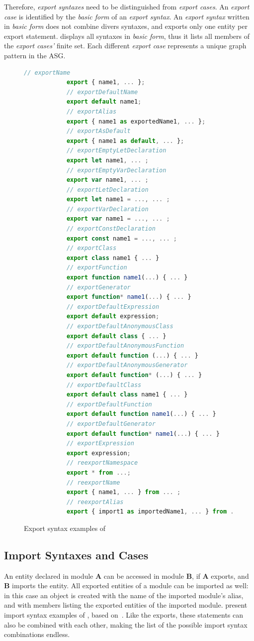 Therefore, \emph{export syntaxes} need to be distinguished from \emph{export cases}. An \emph{export case} is identified by the \emph{basic form} of an \emph{export syntax}. An \emph{export syntax} written in \emph{basic form} does not combine divers syntaxes, and exports only one entity per export statement.  displays all syntaxes in \emph{basic form}, thus it lists all members of the \emph{export cases'} finite set. Each different \emph{export case} represents a unique graph pattern in the ASG.

\begin{figure}[!p]
	\centering
	\begin{lstlisting}[language=JavaScript]
			// exportName
			export { name1, ... };
			// exportDefaultName
			export default name1;
			// exportAlias
			export { name1 as exportedName1, ... };
			// exportAsDefault
			export { name1 as default, ... };
			// exportEmptyLetDeclaration
			export let name1, ... ;
			// exportEmptyVarDeclaration
			export var name1, ... ;
			// exportLetDeclaration
			export let name1 = ..., ... ;
			// exportVarDeclaration
			export var name1 = ..., ... ;
			// exportConstDeclaration
			export const name1 = ..., ... ;
			// exportClass
			export class name1 { ... }
			// exportFunction
			export function name1(...) { ... }
			// exportGenerator
			export function* name1(...) { ... }
			// exportDefaultExpression
			export default expression;
			// exportDefaultAnonymousClass
			export default class { ... }
			// exportDefaultAnonymousFunction
			export default function (...) { ... }
			// exportDefaultAnonymousGenerator
			export default function* (...) { ... }
			// exportDefaultClass
			export default class name1 { ... }
			// exportDefaultFunction
			export default function name1(...) { ... }
			// exportDefaultGenerator
			export default function* name1(...) { ... }
			// exportExpression
			export expression;
			// reexportNamespace
			export * from ...;
			// reexportName
			export { name1, ... } from ... ;
			// reexportAlias
			export { import1 as importedName1, ... } from ...;
	\end{lstlisting}
  \caption{Export syntax examples of }
  \label{fig:export-syntaxes}
\end{figure}


\subsection{Import Syntaxes and Cases}

An entity declared in module \textbf{A} can be accessed in module \textbf{B}, if \textbf{A} exports, and \textbf{B} imports the entity. All exported entities of a module can be imported as well: in this case an object is created with the name of the imported module's alias, and with members listing the exported entities of the imported module.  present import syntax examples of , based on~\cite{import-syntaxes}. Like the exports, these statements can also be combined with each other, making the list of the possible import syntax combinations endless.

